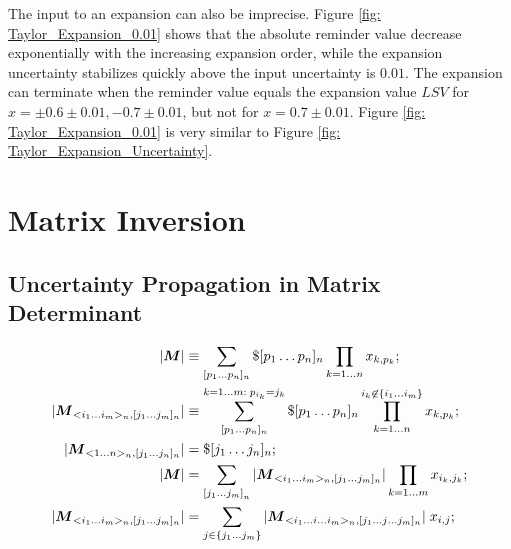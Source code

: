 \documentclass[twoside]{article}
\numberwithin{equation}{section}
\begin{document}
The input to an expansion can also be imprecise.
Figure \ref{fig: Taylor_Expansion_0.01} shows that the absolute reminder value decrease exponentially with the increasing expansion order, while the expansion uncertainty stabilizes quickly above the input uncertainty is $0.01$.  
The expansion can terminate when the reminder value equals the expansion value $LSV$ for $x=\pm 0.6 \pm 0.01, -0.7 \pm 0.01$, but not for $x=0.7 \pm 0.01$.
Figure \ref{fig: Taylor_Expansion_0.01} is very similar to Figure \ref{fig: Taylor_Expansion_Uncertainty}.








\clearpage
\section{Matrix Inversion}
\label{sec: matrix}


\subsection{Uncertainty Propagation in Matrix Determinant}

\iffalse

\begin{align*}
|\protect{\textrm{\boldmath $M$}}| &\equiv \sum_{[p_1\dots p_n]_n} \$ [p_1\dots p_n]_n \prod_{k=1 \dots n} x_{k,p_{k}}; \\
|\protect{\textrm{\boldmath $M$}}_{<i_1 \dots i_m>_n, [j_1 \dots j_m]_n}| &\equiv \sum_{[p_1 \dots p_n]_n}^{k =1 \dots m:\; p_{i_k}=j_k} \$ [p_1\dots p_n]_n 
	\prod _{k = 1 \dots n }^{i_k \not\in \{i_1 \dots i_m\}} x_{k,p_{k}}; \\
|\protect{\textrm{\boldmath $M$}}_{<1 \dots n>_n, [j_1 \dots j_n]_n}| &= \$ [j_1\dots j_n]_n; \\
|\protect{\textrm{\boldmath $M$}}| &= \sum_{{[j_1 \dots j_m]}_n} |\protect{\textrm{\boldmath $M$}} _{<i_1 \dots i_m>_n, [j_1 \dots j_m]_n}| \prod_{k=1 \dots m} x_{i_k, j_k}; \\
|\protect{\textrm{\boldmath $M$}}_{<i_1 \dots i_m>_n, [j_1 \dots j_m]_n}| &= \sum_{j \in \{j_1 \dots j_m\}} |\protect{\textrm{\boldmath $M$}}_{<i_1 \dots i \dots i_m>_n, [j_1 \dots j \dots j_m]_n}| \;x_{i, j};
\end{align*}
\end{document}

